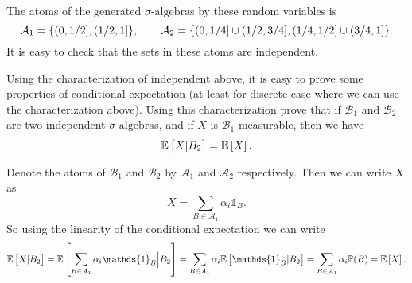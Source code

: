 \begin{summary}
\begin{center}
	\end{center}
	The atoms of the generated $\sigma\text{-algebra}$s by these random variables is
	\[ \mathcal{A}_1 = \{(0,1/2],(1/2,1]\},\qquad \mathcal{A}_2 = \{(0,1/4]\cup (1/2,3/4], (1/4,1/2] \cup  (3/4,1]\}. \]
	It is easy to check that the sets in these atoms are independent.
\end{summary}

\begin{example}
	Using the characterization of independent above, it is easy to prove some properties of conditional expectation (at least for discrete case where we can use the characterization above). Using this characterization prove that if $ \mathcal{B}_1 $ and $ \mathcal{B}_2 $ are two independent $\sigma\text{-algebra}$s, and if $ X $ is $ \mathcal{B}_1 $ measurable, then we have
	\[ \mathbb{E}\left[X|B_2\right] = \mathbb{E}\left[X\right]. \]
\end{example}
\begin{solution}
	Denote the atoms of $ \mathcal{B}_1 $ and $ \mathcal{B}_2 $ by $ \mathcal{A}_1 $ and $ \mathcal{A}_2 $ respectively. Then we can write $ X $ as 
	\[ X = \sum_{B \in \mathcal{A}_1} \alpha_i \mathds{1}_B.  \]
	So using the linearity of the conditional expectation we can write
	\[ \E{X|B_2} = \E{\sum_{B\in\mathcal{A}_1}\alpha_i \mathds{1}_B\big|B_2} = \sum_{B\in\mathcal{A}_1}\alpha_i \E{\mathds{1}_B|B_2} = \sum_{B\in\mathcal{A}_1} \alpha_i \prob(B) = \E{X}. \]
\end{solution}


